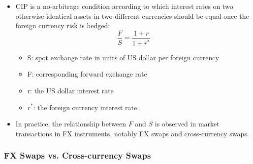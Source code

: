\begin{itemize}
  \item CIP is a no-arbitrage condition according to which interest rates on two otherwise identical assets in two different currencies should be equal once the foreign currency risk is hedged:
  \[\frac{F}{S} = \frac{1 + r}{1 + r^*}\]
    \begin{itemize}
    \item S: spot exchange rate in units of US dollar per foreign currency
    \item F: corresponding forward exchange rate
    \item r: the US dollar interest rate
    \item $r^*$: the foreign currency interest rate.
    \end{itemize}

  \item In practice, the relationship between \(F\) and \(S\) is observed in market transactions in FX instruments, notably FX swaps and cross-currency swaps.
\end{itemize}



\subsubsection{FX Swaps vs. Cross-currency Swaps}

